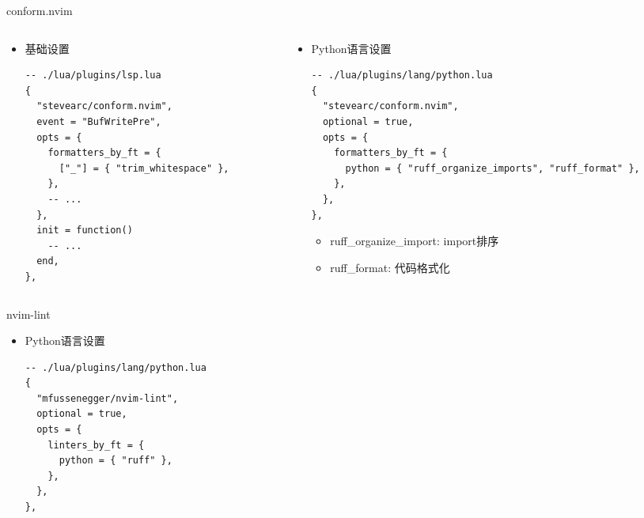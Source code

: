 \documentclass[aspectratio=169]{ctexbeamer}
\begin{document}
\begin{frame}[fragile]{conform.nvim}
  \begin{columns}
    \begin{column}[t]{0.5\linewidth}
      \begin{itemize}
        \item 基础设置
          \begin{lstlisting}[basicstyle=\tiny\ttfamily]
-- ./lua/plugins/lsp.lua
{
  "stevearc/conform.nvim",
  event = "BufWritePre",
  opts = {
    formatters_by_ft = {
      ["_"] = { "trim_whitespace" },
    },
    -- ...
  },
  init = function()
    -- ...
  end,
},
          \end{lstlisting}
      \end{itemize}
    \end{column}

    \begin{column}[t]{0.5\linewidth}
      \begin{itemize}
        \item Python语言设置
          \begin{lstlisting}[basicstyle=\tiny\ttfamily]
-- ./lua/plugins/lang/python.lua
{
  "stevearc/conform.nvim",
  optional = true,
  opts = {
    formatters_by_ft = {
      python = { "ruff_organize_imports", "ruff_format" },
    },
  },
},
          \end{lstlisting}
          \begin{itemize}
              \footnotesize
            \item ruff\_organize\_import: import排序
            \item ruff\_format: 代码格式化
          \end{itemize}
      \end{itemize}
    \end{column}
  \end{columns}
\end{frame}

\begin{frame}[fragile]{nvim-lint}
  \begin{itemize}
    \item Python语言设置
      \begin{lstlisting}[basicstyle=\tiny\ttfamily]
-- ./lua/plugins/lang/python.lua
{
  "mfussenegger/nvim-lint",
  optional = true,
  opts = {
    linters_by_ft = {
      python = { "ruff" },
    },
  },
},
      \end{lstlisting}
  \end{itemize}
\end{frame}
\end{document}
